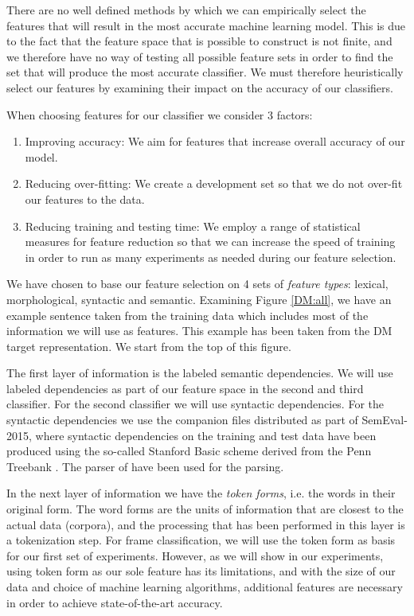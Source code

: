 There are no well defined methods by which we can empirically select the features that will result in the most accurate machine learning model. This is due to the fact that the feature space that is possible to construct is not finite, and we therefore have no way of testing all possible feature sets in order to find the set that will produce the most accurate classifier. We must therefore heuristically select our features by examining their impact on the accuracy of our classifiers.

When choosing features for our classifier we consider 3 factors:

\begin{enumerate}
    \item Improving accuracy: We aim for features that increase overall accuracy of our model.
    \item Reducing over-fitting: We create a development set so that we do not over-fit our features to the data.
    \item Reducing training and testing time: We employ a range of statistical measures for feature reduction so that we can increase the speed of training in order to run as many experiments as needed during our feature selection.
\end{enumerate}

We have chosen to base our feature selection on 4 sets of \textit{feature types}: lexical, morphological, syntactic and semantic. Examining Figure \ref{DM:all}, we have an example sentence taken from the training data which includes most of the information we will use as features. This example has been taken from the DM target representation. We start from the top of this figure. 

The first layer of information is the labeled semantic dependencies. We will use labeled dependencies as part of our feature space in the second and third classifier. For the second classifier we will use syntactic dependencies. For the syntactic dependencies we use the companion files distributed as part of SemEval-2015, where syntactic dependencies on the training and test data have been produced using the so-called Stanford Basic scheme derived from the Penn Treebank \cite{PennTreebank}. The parser of  have been used for the parsing.

In the next layer of information we have the \textit{token forms}, i.e. the words in their original form. The word forms are the units of information that are closest to the actual data (corpora), and the processing that has been performed in this layer is a tokenization step. For frame classification, we will use the token form as basis for our first set of experiments. However, as we will show in our experiments, using token form as our sole feature has its limitations, and with the size of our data and choice of machine learning algorithms, additional features are necessary in order to achieve state-of-the-art accuracy.

